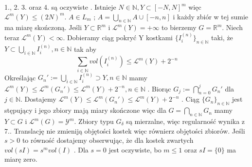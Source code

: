 
    1., 2. 3. oraz 4. są oczywiste . Istnieje $N \in \mathbb{N}, Y \subset [-N, N]^m$ więc $\mathcal{L}^m(Y) \leq (2N)^m$. $A \in L_m$ ; $A = \bigcup_{n \in \mathbb{N}} A \cup [-n,n]$ i każdy zbiór w tej sumie ma miarę skończoną. Jeśli $Y \subset \mathbb{R}^m$ i $\mathcal{L}^m(Y) = +\infty$ to bierzemy $G = \mathbb{R}^m$. Niech teraz $\mathcal{L}^m(Y) < \infty$. Dobieramy ciąg pokryć Y kostkami $\{I_i^{(n)}\}_{n \in \mathbb{N}}$ taki, że $Y \subset \bigcup_{i \in \mathbb{N}} I_i^{(n)}, n \in \mathbb{N}$ tak aby $$ \sum_{i \in \mathbb{N}} vol(I_i^{(n)}) \leq \mathcal{L}^m(Y) + 2^{-n} $$ Określając $G_n' := \bigcup_{i \in \mathbb{N}} I^{(n)}_i \supset Y, n \in \mathbb{N}$ mamy $\mathcal{L}^m(Y) \leq \mathcal{L}^m(G_n') \leq \mathcal{L}^m(Y) + 2^{-n}, n \in \mathbb{N}$ . Biorąc $G_j := \bigcap_{n = 0}^j G_n'$ dla $j \in \mathbb{N}$. Dostajemy $\mathcal{L}^m(Y) \leq \mathcal{L}^m(G_n') \leq \mathcal{L}^m(Y) + 2^{-n}$ . Ciąg $\{G_n\}_{n \in \mathbb{N}}$ jest stępujący i jego zbiory mają miary skończone więc dla $G = \bigcap_{n \in \mathbb{N}} G_n$ mamy $Y \subset G$ i $\mathcal{L}^m(G) = \mathcal{Y}^m$. Zbiory typu $G_{\delta}$ są mierzalne, więc regularność wynika z 7.. Translację nie zmieniją objętości kostek więc równierz objętości zbiorów. Jeśli $s>0$ to równość dostajemy obserwując, że dla kostek zwartych $vol(sI) = s^m vol(I)$ . Dla $s=0$ jest oczywiste, bo $m \leq 1$ oraz $sI = \{0\}$ ma miarę zero.  \newline
